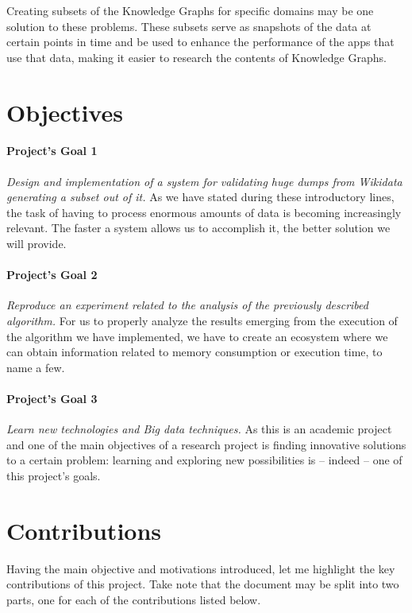 Creating subsets of the Knowledge Graphs for specific domains may be one solution to these problems. These subsets serve as snapshots of the data at certain points in time and be used to enhance the performance of the apps that use that data, making it easier to research the contents of Knowledge Graphs.

\section{Objectives}

\paragraph{Project's Goal 1}
\textit{Design and implementation of a system for validating huge dumps from Wikidata generating a subset out of it.} As we have stated during these introductory lines, the task of having to process enormous amounts of data is becoming increasingly relevant. The faster a system allows us to accomplish it, the better solution we will provide.

\paragraph{Project's Goal 2}
\textit{Reproduce an experiment related to the analysis of the previously described algorithm.} For us to properly analyze the results emerging from the execution of the algorithm we have implemented, we have to create an ecosystem where we can obtain information related to memory consumption or execution time, to name a few.

\paragraph{Project's Goal 3}
\textit{Learn new technologies and Big data techniques.} As this is an academic project and one of the main objectives of a research project is finding innovative solutions to a certain problem: learning and exploring new possibilities is -- indeed -- one of this project's goals.

\section{Contributions}

Having the main objective and motivations introduced, let me highlight the key contributions of this project. Take note that the document may be split into two parts, one for each of the contributions listed below.

